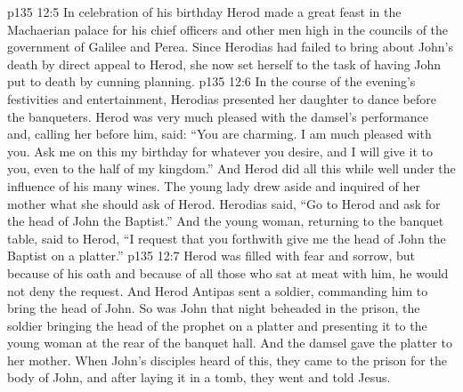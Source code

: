 \vs p135 12:5 \pc In celebration of his birthday Herod made a great feast in the Machaerian palace for his chief officers and other men high in the councils of the government of Galilee and Perea. Since Herodias had failed to bring about John’s death by direct appeal to Herod, she now set herself to the task of having John put to death by cunning planning.
\vs p135 12:6 In the course of the evening’s festivities and entertainment, Herodias presented her daughter to dance before the banqueters. Herod was very much pleased with the damsel’s performance and, calling her before him, said: “You are charming. I am much pleased with you. Ask me on this my birthday for whatever you desire, and I will give it to you, even to the half of my kingdom.” And Herod did all this while well under the influence of his many wines. The young lady drew aside and inquired of her mother what she should ask of Herod. Herodias said, “Go to Herod and ask for the head of John the Baptist.” And the young woman, returning to the banquet table, said to Herod, “I request that you forthwith give me the head of John the Baptist on a platter.”
\vs p135 12:7 Herod was filled with fear and sorrow, but because of his oath and because of all those who sat at meat with him, he would not deny the request. And Herod Antipas sent a soldier, commanding him to bring the head of John. So was John that night beheaded in the prison, the soldier bringing the head of the prophet on a platter and presenting it to the young woman at the rear of the banquet hall. And the damsel gave the platter to her mother. When John’s disciples heard of this, they came to the prison for the body of John, and after laying it in a tomb, they went and told Jesus.
